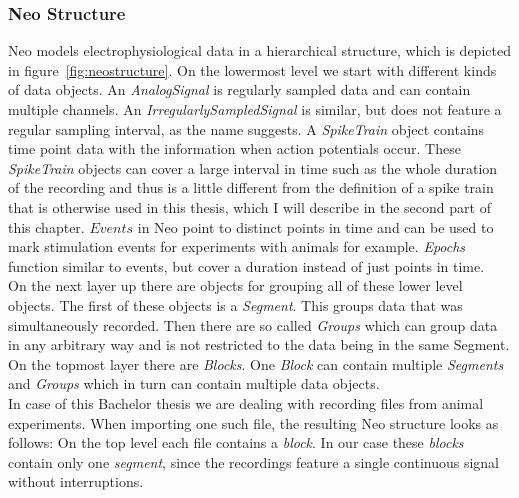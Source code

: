 \subsubsection{Neo Structure}
Neo models electrophysiological data in a hierarchical structure, which is depicted in figure~\ref{fig:neostructure}. On the lowermost level we start with different kinds of data objects. An \textit{AnalogSignal} is regularly sampled data and can contain multiple channels. An \textit{IrregularlySampledSignal} is similar, but does not feature a regular sampling interval, as the name suggests. A \textit{SpikeTrain} object contains time point data with the information when action potentials occur. These \textit{SpikeTrain} objects can cover a large interval in time such as the whole duration of the recording and thus is a little different from the definition of a spike train that is otherwise used in this thesis, which I will describe in the second part of this chapter. 
$Events$ in Neo point to distinct points in time and can be used to mark stimulation events for experiments with animals for example. \textit{Epochs} function similar to events, but cover a duration instead of just points in time.\\
On the next layer up there are objects for grouping all of these lower level objects. The first of these objects is a \textit{Segment}. This groups data that was simultaneously recorded. Then there are so called \textit{Groups} which can group data in any arbitrary way and is not restricted to the data being in the same Segment. On the topmost layer there are \textit{Blocks}. One \textit{Block} can contain multiple \textit{Segments} and \textit{Groups} which in turn can contain multiple data objects.\\

In case of this Bachelor thesis we are dealing with recording files from animal experiments. When importing one such file, the resulting Neo structure looks as follows: On the top level each file contains a \textit{block}. In our case these \textit{blocks} contain only one \textit{segment}, since the recordings feature a single continuous signal without interruptions.

